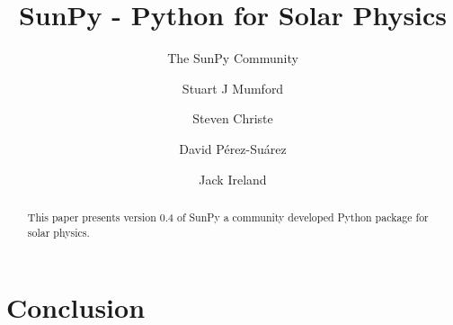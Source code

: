 \documentclass[12pt]{iopart}
\begin{document}
\title{SunPy - Python for Solar Physics}

\author{The SunPy Community}
\address{\url{http://sunpy.org}}

\author{Stuart J Mumford}
\address{Solar Physics \& Space Plasma Research Centre (SP$^{2}$RC), School of 
Mathematics and Statistics, The University of Sheffield, Hicks Building, 
Hounsfield Road, Sheffield, S3 7RH U.K.}

\author{Steven Christe}
\address{NASA Goddard Space Flight Center, Greenbelt, U.S.A.}

\author{David P\'erez-Su\'arez}
\address{South African National Space Agency - Space Science,
Hospital Street, 7200 Hermanus, Western Cape, South Africa}

\author{Jack Ireland}
\address{ADNET Systems Inc., Mail Code 671.1, NASA Goddard Space
  Flight Center, Greenbelt, MD, U.S.A.}

\begin{abstract}
This paper presents version 0.4 of SunPy a community developed Python package 
for solar physics.

\end{abstract}

\maketitle


\label{sec:Intro}


\label{sec:DataTypes}


\label{sec:retrevial}


\label{sec:util}


\label{sec:dev}


\label{sec:future}

\section{Conclusion}


{}
\end{document}
